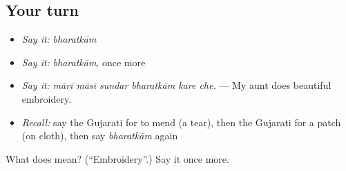\subsection*{Your turn}
\begin{itemize}
\raggedright
  \item \emph{Say it:} \emph{bharatkām}
  \item \emph{Say it:} \emph{bharatkām}, once more
  \item \emph{Say it:} \emph{mārī māsī sundar bharatkām kare che.} — My aunt does beautiful embroidery.
  \item \emph{Recall:} say the Gujarati for to mend (a tear), then the Gujarati for a patch (on cloth), then say \emph{bharatkām} again
\end{itemize}

\begin{tcolorbox}[breakable,colback=teal!4,colframe=teal!35!black,title={Before you move on}]
What does  mean? (\textquotedblleft{}Embroidery\textquotedblright{}.) Say it once more.
\end{tcolorbox}

